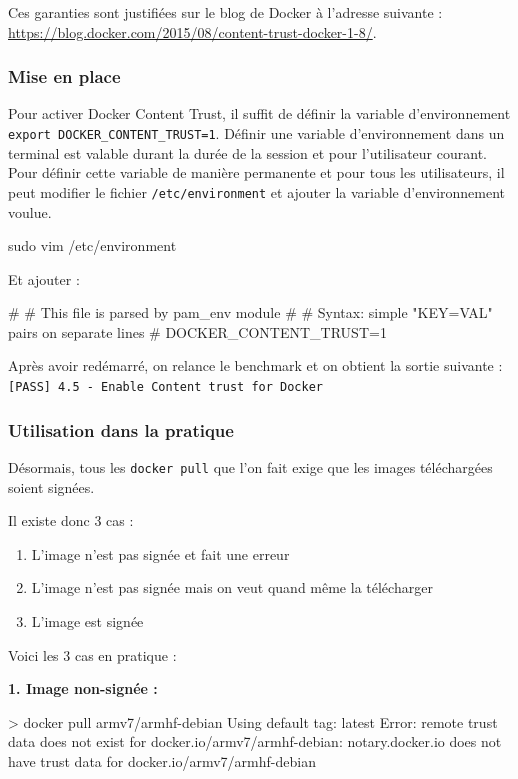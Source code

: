 \documentclass[11pt,a4paper,oneside]{report}
\newcommand{\code}[1]{\texttt{#1}}
\begin{document}
Ces garanties sont justifiées sur le blog de Docker à l'adresse suivante : \url{https://blog.docker.com/2015/08/content-trust-docker-1-8/}.

\subsubsection{Mise en place}
Pour activer Docker Content Trust, il suffit de définir la variable d'environnement \linebreak \code{export DOCKER\_CONTENT\_TRUST=1}. Définir une variable d'environnement dans un terminal est valable durant la durée de la session et pour l'utilisateur courant. Pour définir cette variable de manière permanente et pour tous les utilisateurs, il peut modifier le fichier \code{/etc/environment} et ajouter la variable d'environnement voulue.

\begin{bashcode}
sudo vim /etc/environment
\end{bashcode}

Et ajouter :
\begin{bashcode}
#
# This file is parsed by pam_env module
#
# Syntax: simple "KEY=VAL" pairs on separate lines
#
DOCKER_CONTENT_TRUST=1
\end{bashcode}

Après avoir redémarré, on relance le benchmark et on obtient la sortie suivante : \code{[PASS] 4.5  - Enable Content trust for Docker}

\subsubsection{Utilisation dans la pratique}
Désormais, tous les \code{docker pull} que l'on fait exige que les images téléchargées soient signées. 

Il existe donc 3 cas :
\begin{enumerate}
\item L'image n'est pas signée et fait une erreur
\item L'image n'est pas signée mais on veut quand même la télécharger
\item L'image est signée
\end{enumerate}

Voici les 3 cas en pratique :

\textbf{1. Image non-signée :}
\begin{textcode}
> docker pull armv7/armhf-debian
Using default tag: latest
Error: remote trust data does not exist for docker.io/armv7/armhf-debian: notary.docker.io does not have trust data for docker.io/armv7/armhf-debian
\end{textcode}
\end{document}
